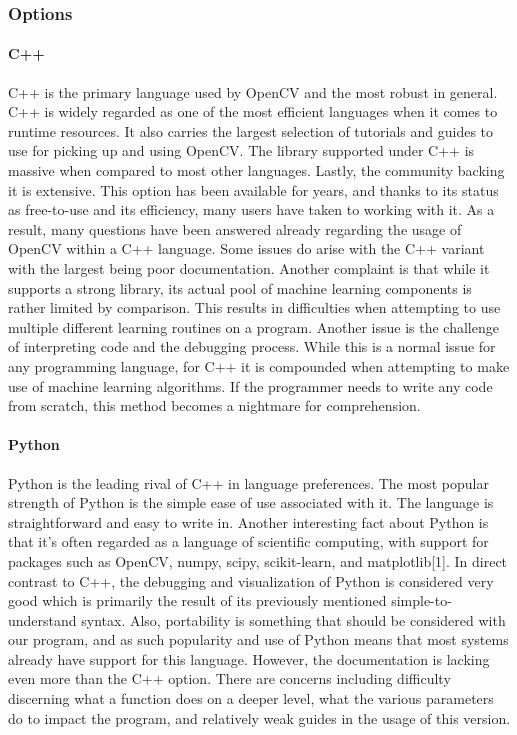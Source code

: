 \documentclass[article, onecolumn, draftclsnofoot,10pt, compsoc]{IEEEtran}
\begin{document}
\subsubsection{Options}
\paragraph{C++}
C++ is the primary language used by OpenCV and the most robust in general. C++ is widely regarded as one of the most efficient languages when it comes to runtime resources. It also carries the largest selection of tutorials and guides to use for picking up and using OpenCV. The library supported under C++ is massive when compared to most other languages. Lastly, the community backing it is extensive. This option has been available for years, and thanks to its status as free-to-use and its efficiency, many users have taken to working with it. As a result, many questions have been answered already regarding the usage of OpenCV within a C++ language. Some issues do arise with the C++ variant with the largest being poor documentation. Another complaint is that while it supports a strong library, its actual pool of machine learning components is rather limited by comparison. This results in difficulties when attempting to use multiple different learning routines on a program. Another issue is the challenge of interpreting code and the debugging process. While this is a normal issue for any programming language, for C++ it is compounded when attempting to make use of machine learning algorithms. If the programmer needs to write any code from scratch, this method becomes a nightmare for comprehension.

\paragraph{Python}
Python is the leading rival of C++ in language preferences. The most popular strength of Python is the simple ease of use associated with it. The language is straightforward and easy to write in. Another interesting fact about Python is that it’s often regarded as a language of scientific computing, with support for packages such as OpenCV, numpy, scipy, scikit-learn, and matplotlib[1]. In direct contrast to C++, the debugging and visualization of Python is considered very good which is primarily the result of its previously mentioned simple-to-understand syntax. Also, portability is something that should be considered with our program, and as such popularity and use of Python means that most systems already have support for this language. However, the documentation is lacking even more than the C++ option. There are concerns including difficulty discerning what a function does on a deeper level, what the various parameters do to impact the program, and relatively weak guides in the usage of this version.
\end{document}
